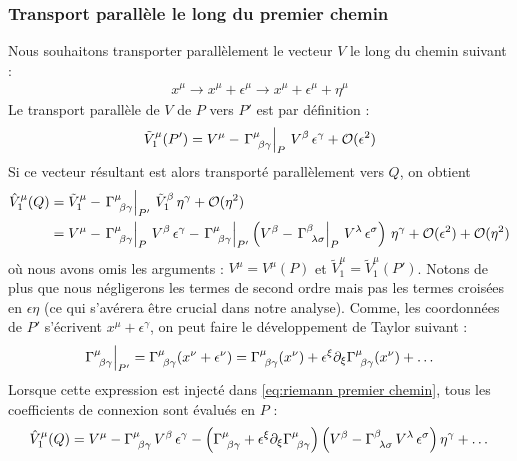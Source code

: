 \subsubsection{Transport parallèle le long du premier chemin}
Nous souhaitons transporter parallèlement le vecteur $V$ le long du chemin suivant :
\begin{align}
        x^\mu \rightarrow x^\mu+\epsilon^\mu \rightarrow  x^\mu + \epsilon^\mu + \eta^\mu
\end{align}
Le transport parallèle de $V$ de $P$ vers $P'$ est par définition :
\begin{equation}
    \tilde{V}^\mu_1 (P') = V^\mu - \left. \Gamma\indices{^\mu_{\!\beta \gamma}}\right|_P \, V^\beta \, \epsilon^\gamma + \mathcal{O}(\epsilon^2)
\end{equation}
Si ce vecteur résultant est alors transporté parallèlement vers $Q$, on obtient 
\begin{align}
\label{eq:riemann premier chemin}
    \hat{V}^\mu_1 (Q) &= \tilde{V}^\mu_1 - \left. \Gamma\indices{^\mu_{\!\beta \gamma}} \right|_{P'} \, \tilde{V}^\beta_1 \,  \eta^\gamma + \mathcal{O}(\eta^2)\\
     \nonumber
    & = V^\mu - \left. \Gamma\indices{^\mu_{\!\beta \gamma}} \right|_P \, V^\beta \, \epsilon^\gamma - \left. \Gamma\indices{^\mu_{\!\beta \gamma}} \right|_{P'} \lt V^\beta -\left. \Gamma\indices{^\beta_{\!\lambda \sigma}}\right|_P \, V^\lambda \, \epsilon^\sigma \rt \, \eta^\gamma +  \mathcal{O}(\epsilon^2) + \mathcal{O}(\eta^2)
\end{align}
où nous avons omis les arguments : $V^\mu = V^\mu(P)$ et $\tilde{V}^\mu_1 = \tilde{V}^\mu_1 (P')$. Notons de plus que nous négligerons les termes de second ordre mais pas les termes croisées en $\epsilon \eta$ (ce qui s'avérera être crucial dans notre analyse). Comme, les coordonnées de $P'$ s'écrivent $x^\mu + \epsilon^\gamma$, on peut faire le développement de Taylor suivant :
\begin{equation}
    \label{eq:taylor connexion}
    \left. \Gamma\indices{^\mu_{\!\beta \gamma}} \right|_{P'} = \Gamma\indices{^\mu_{\!\beta \gamma}} (x^\nu +\epsilon^\nu ) = \Gamma\indices{^\mu_{\!\beta \gamma}} (x^\nu) + \epsilon^\xi \pd_\xi \Gamma\indices{^\mu_{\!\beta \gamma}} (x^\nu) + \dots
\end{equation}
Lorsque cette expression est injecté dans \ref{eq:riemann premier chemin}, tous les coefficients de connexion sont évalués en $P$ :
\begin{equation}
    \label{eq: premier chemin}
    \hat{V}^\mu_1 (Q) = V^\mu - \Gamma\indices{^\mu_{\!\beta \gamma}}  \, V^\beta \, \epsilon^\gamma - \lt \Gamma\indices{^\mu_{\!\beta \gamma}} + \epsilon^\xi \pd_\xi \Gamma\indices{^\mu_{\!\beta \gamma}} \rt \lt V^\beta - \Gamma\indices{^\beta_{\!\lambda \sigma}} \, V^\lambda \, \epsilon^\sigma \rt \eta^\gamma +  \dots
\end{equation} 
